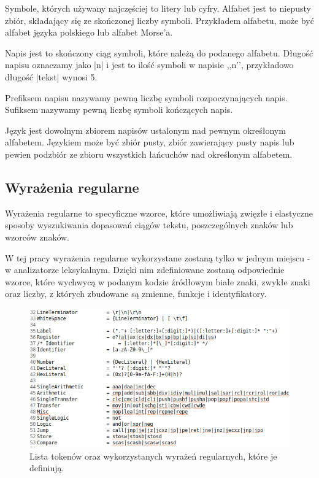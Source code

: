 \documentclass[a4paper,12pt]{article}
\begin{document}
Symbole, których używany najczęściej to litery lub cyfry. Alfabet jest to niepusty zbiór, składający się ze skończonej liczby symboli. Przykładem alfabetu, może być alfabet języka polskiego lub alfabet Morse’a.

Napis jest to skończony ciąg symboli, które należą do podanego alfabetu. Długość napisu oznaczamy jako |n| i jest to ilość symboli w napisie ,,n’’, przykładowo długość |tekst| wynosi 5.

Prefiksem napisu nazywamy pewną liczbę symboli rozpoczynających napis. Sufiksem nazywamy pewną liczbę symboli kończących napis. 

Język jest dowolnym zbiorem napisów ustalonym nad pewnym okreśłonym alfabetem. Językiem może być zbiór pusty, zbiór zawierający pusty napis lub pewien podzbiór ze zbioru wszystkich łańcuchów nad określonym alfabetem.

\subsection{Wyrażenia regularne}

Wyrażenia regularne to specyficzne wzorce, które umożliwiają zwięzłe i elastyczne sposoby wyszukiwania dopasowań ciągów tekstu, poszczególnych znaków lub wzorców znaków.

W tej pracy wyrażenia regularne wykorzystane zostaną tylko w jednym miejscu - w analizatorze leksykalnym. Dzięki nim zdefiniowane zostaną odpowiednie wzorce, które wychwycą w podanym kodzie źródłowym białe znaki, zwykłe znaki oraz liczby, z których zbudowane są zmienne, funkcje i identyfikatory.

\begin{figure}[h!]
\centering
\includegraphics[scale=0.7]{gfx/regexp.png}
\caption{Lista tokenów oraz wykorzystanych wyrażeń regularnych, które je definiują.}
\end{figure}
\end{document}
